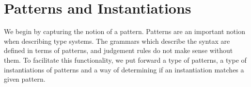 \section{Patterns and Instantiations}


We begin by capturing the notion of a pattern. Patterns are an important
notion when describing type systems. The grammars which describe the syntax
are defined in terms of patterns, and judgement rules do not make sense
without them. To facilitate this functionality, we put forward a type of
patterns, a type of instantiations of patterns and a way of determining if
an instantiation matches a given pattern.

